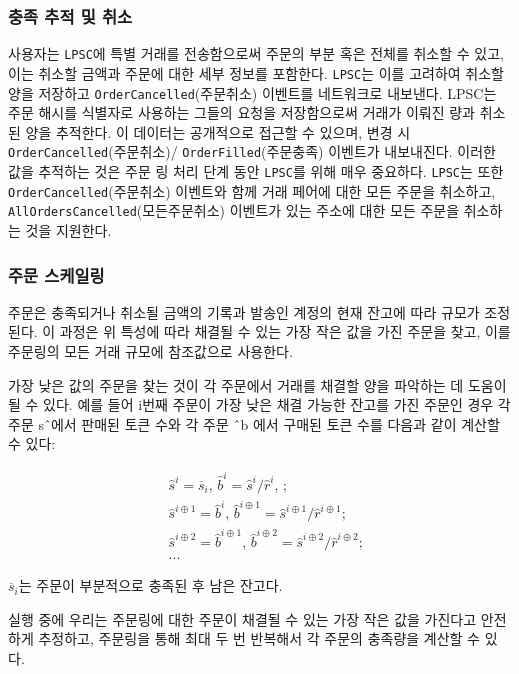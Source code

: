 \documentclass{article}
\begin{document}
\begin{multicols}{2}
\subsubsection{충족 추적 및 취소}

사용자는 \verb|LPSC|에 특별 거래를 전송함으로써 주문의 부분 혹은 전체를 취소할 수 있고, 이는 취소할 금액과 주문에 대한 세부 정보를 포함한다. \verb|LPSC|는 이를 고려하여 취소할 양을 저장하고 \verb|OrderCancelled|(주문취소) 이벤트를 네트워크로 내보낸다. LPSC는 주문 해시를 식별자로 사용하는 그들의 요청을 저장함으로써 거래가 이뤄진 량과 취소된 양을 추적한다. 이 데이터는 공개적으로 접근할 수 있으며, 변경 시 \verb|OrderCancelled|(주문취소)/ \verb|OrderFilled|(주문충족) 이벤트가 내보내진다. 이러한 값을 추적하는 것은 주문 링 처리 단계 동안 \verb|LPSC|를 위해 매우 중요하다.
\verb|LPSC|는 또한 \verb|OrderCancelled|(주문취소) 이벤트와 함께 거래 페어에 대한 모든 주문을 취소하고, \verb|AllOrdersCancelled|(모든주문취소) 이벤트가 있는 주소에 대한 모든 주문을 취소하는 것을 지원한다.

\subsubsection{주문 스케일링\label{sec:order_scaling}}
주문은 충족되거나 취소될 금액의 기록과 발송인 계정의 현재 잔고에 따라 규모가 조정된다. 이 과정은 위 특성에 따라 채결될 수 있는 가장 작은 값을 가진 주문을 찾고, 이를 주문링의 모든 거래 규모에 참조값으로 사용한다.

가장 낮은 값의 주문을 찾는 것이 각 주문에서 거래를 채결할 양을 파악하는 데 도움이 될 수 있다. 예를 들어 i번째 주문이 가장 낮은 채결 가능한 잔고를 가진 주문인 경우 각 주문 sˆ에서 판매된 토큰 수와 각 주문 ˆb  에서 구매된 토큰 수를 다음과 같이 계산할 수 있다:

\[
\begin{split}
&\hat{s}^{i}=\overline{s}_i\text{, } \hat{b}^{i}=\hat{s}^{i}/ \hat{r}^i\text{, }\text{;}\\
&\hat{s}^{i\oplus 1}=\hat{b}^i\text{, } \hat{b}^{i\oplus 1}=\hat{s}^{i\oplus 1}/ \hat{r}^{i\oplus 1}\text{;}\\
&\hat{s}^{i\oplus 2}=\hat{b}^{i\oplus 1}\text{, } \hat{b}^{i\oplus 2}=\hat{s}^{i\oplus 2}/ \hat{r}^{i\oplus 2}\text{;}\\
& ...
\end{split}
\]

$\overline{s}_i$는 주문이 부분적으로 충족된 후 남은 잔고다.

실행 중에 우리는 주문링에 대한 주문이 채결될 수 있는 가장 작은 값을 가진다고 안전하게 추정하고, 주문링을 통해 최대 두 번 반복해서 각 주문의 충족량을 계산할 수 있다.


\end{multicols}
\end{document}

